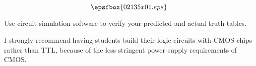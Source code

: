 

$$\epsfbox{02135x01.eps}$$

\vfil \eject






Use circuit simulation software to verify your predicted and actual truth tables.







I strongly recommend having students build their logic circuits with CMOS chips rather than TTL, because of the less stringent power supply requirements of CMOS.




